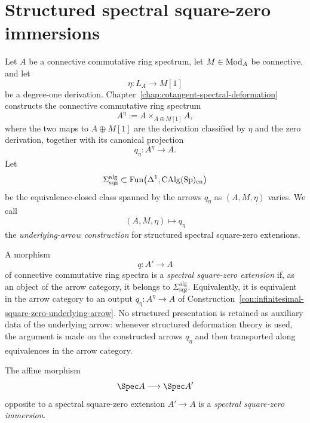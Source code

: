 \section{Structured spectral square-zero immersions}
\label{sec:infinitesimal-square-zero}

\begin{construction}
\label{con:infinitesimal-square-zero-underlying-arrow}
Let \(A\) be a connective commutative ring spectrum, let
\(M\in\operatorname{Mod}_A\) be connective, and let
\[
    \eta:L_A\longrightarrow M[1]
\]
be a degree-one derivation.  Chapter~\ref{chap:cotangent-spectral-deformation}
constructs the connective commutative ring spectrum
\[
    A^\eta
    :=
    A\times_{A\oplus M[1]}A,
\]
where the two maps to \(A\oplus M[1]\) are the derivation classified by
\(\eta\) and the zero derivation, together with its canonical projection
\[
    q_\eta:A^\eta\longrightarrow A.
\]
Let
\[
    \Sigma_{\mathrm{sqz}}^{\mathrm{alg}}
    \subset
    \operatorname{Fun}\!\left(
      \Delta^1,
      \operatorname{CAlg}(\mathrm{Sp})_{\mathrm{cn}}
    \right)
\]
be the equivalence-closed class spanned by the arrows \(q_\eta\) as
\((A,M,\eta)\) varies.  We call
\[
    (A,M,\eta)\longmapsto q_\eta
\]
the \emph{underlying-arrow construction} for structured spectral square-zero
extensions.
\end{construction}

\begin{definition}
\label{def:infinitesimal-square-zero-extension}
A morphism
\[
    q:A'\longrightarrow A
\]
of connective commutative ring spectra is a \emph{spectral square-zero
extension} if, as an object of the arrow category, it belongs to
\(\Sigma_{\mathrm{sqz}}^{\mathrm{alg}}\).  Equivalently, it is equivalent in
the arrow category to an output \(q_\eta:A^\eta\to A\) of
Construction~\ref{con:infinitesimal-square-zero-underlying-arrow}.  No
structured presentation is retained as auxiliary data of the underlying
arrow: whenever structured deformation theory is used, the argument is made
on the constructed arrows \(q_\eta\) and then transported along equivalences
in the arrow category.
\end{definition}

\begin{definition}
\label{def:infinitesimal-square-zero-immersion}
The affine morphism
\[
    \Spec A\longrightarrow\Spec A'
\]
opposite to a spectral square-zero extension $A'\to A$ is a
\emph{spectral square-zero immersion}.
\end{definition}

